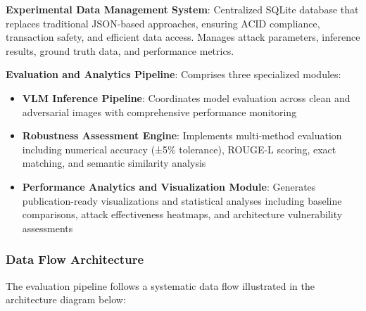 \textbf{Experimental Data Management System}: Centralized SQLite database that replaces traditional JSON-based approaches, ensuring ACID compliance, transaction safety, and efficient data access. Manages attack parameters, inference results, ground truth data, and performance metrics.

\textbf{Evaluation and Analytics Pipeline}: Comprises three specialized modules:
\begin{itemize}
    \item \textbf{VLM Inference Pipeline}: Coordinates model evaluation across clean and adversarial images with comprehensive performance monitoring
    \item \textbf{Robustness Assessment Engine}: Implements multi-method evaluation including numerical accuracy (±5\% tolerance), ROUGE-L scoring, exact matching, and semantic similarity analysis
    \item \textbf{Performance Analytics and Visualization Module}: Generates publication-ready visualizations and statistical analyses including baseline comparisons, attack effectiveness heatmaps, and architecture vulnerability assessments
\end{itemize}

\subsubsection{Data Flow Architecture}

The evaluation pipeline follows a systematic data flow illustrated in the architecture diagram below:

